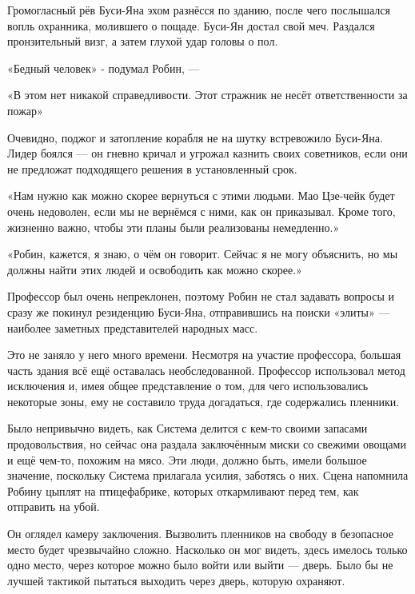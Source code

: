 \documentclass[a4paper,12pt]{book}
\begin{document}
\par
Громогласный рёв Буси-Яна эхом разнёсся по зданию, после чего послышался вопль охранника, молившего о пощаде. Буси-Ян достал свой меч. Раздался пронзительный визг, а затем глухой удар головы о пол.\\
\par
«Бедный человек» - подумал Робин, —
\par
«В этом нет никакой справедливости. Этот стражник не несёт ответственности за пожар»\\
\par
Очевидно, поджог и затопление корабля не на шутку встревожило Буси-Яна. Лидер боялся — он гневно кричал и угрожал казнить своих советников, если они не предложат подходящего решения в установленный срок.
\par
«Нам нужно как можно скорее вернуться с этими людьми. Мао Цзе-чейк будет очень недоволен, если мы не вернёмся с ними, как он приказывал. Кроме того, жизненно важно, чтобы эти планы были реализованы немедленно.»\\
\par
«Робин, кажется, я знаю, о чём он говорит. Сейчас я не могу объяснить, но мы должны найти этих людей и освободить как можно скорее.»
\par
Профессор был очень непреклонен, поэтому Робин не стал задавать вопросы и сразу же покинул резиденцию Буси-Яна, отправившись на поиски «элиты» — наиболее заметных представителей народных масс.
\par
Это не заняло у него много времени. Несмотря на участие профессора, большая часть здания всё ещё оставалась необследованной. Профессор использовал метод исключения и, имея общее представление о том, для чего использовались некоторые зоны, ему не составило труда догадаться, где содержались пленники.
\par
Было непривычно видеть, как Система делится с кем-то своими запасами продовольствия, но сейчас она раздала заключённым миски со свежими овощами и ещё чем-то, похожим на мясо. Эти люди, должно быть, имели большое значение, поскольку Система прилагала усилия, заботясь о них. Сцена напомнила Робину цыплят на птицефабрике, которых откармливают перед тем, как отправить на убой.
\par
Он оглядел камеру заключения. Вызволить пленников на свободу в безопасное место будет чрезвычайно сложно. Насколько он мог видеть, здесь имелось только одно место, через которое можно было войти или выйти — дверь. Было бы не лучшей тактикой пытаться выходить через дверь, которую охраняют.
\end{document}
